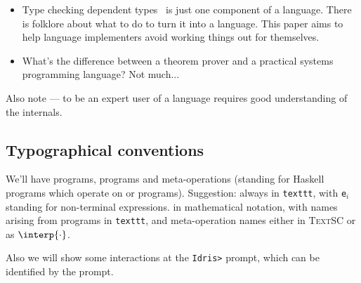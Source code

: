 \begin{itemize}
\item Type checking dependent types~\cite{Chapman2005epigram,loh2010tutorial} is just one component
 of a language. There is folklore about what to do to turn it into a language. This
 paper aims to help language implementers avoid working things out for themselves.
\item What's the difference between a theorem prover and a practical systems programming
 language? Not much...
\end{itemize}

Also note --- to be an expert user of a language requires good understanding of the internals.

\subsection{Typographical conventions}

We'll have \Idris{} programs, \TT{} programs and meta-operations (standing for
Haskell programs which operate on \Idris{} or \TT{} programs). Suggestion:
\Idris{} always in \texttt{texttt}, with \texttt{e$_i$} standing for
non-terminal expressions.  \TT{} in mathematical notation, with names arising
from \Idris{} programs in \texttt{texttt}, and meta-operation
names either in \textsc{TextSC} or as $\interp{\cdot}$.

Also we will show some interactions at the \texttt{Idris>} prompt, which can be identified
by the prompt.
